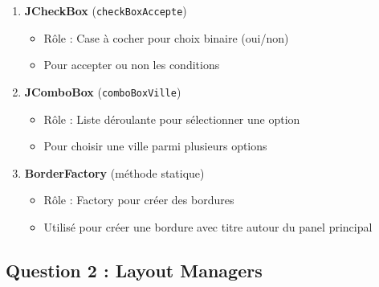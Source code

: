 \documentclass[11pt,a4paper]{article}
\begin{document}
\begin{correctionbox}
\begin{enumerate}
    \item \textbf{JCheckBox} (\texttt{checkBoxAccepte})
    \begin{itemize}
        \item Rôle : Case à cocher pour choix binaire (oui/non)
        \item Pour accepter ou non les conditions
    \end{itemize}
    
    \item \textbf{JComboBox} (\texttt{comboBoxVille})
    \begin{itemize}
        \item Rôle : Liste déroulante pour sélectionner une option
        \item Pour choisir une ville parmi plusieurs options
    \end{itemize}
    
    \item \textbf{BorderFactory} (méthode statique)
    \begin{itemize}
        \item Rôle : Factory pour créer des bordures
        \item Utilisé pour créer une bordure avec titre autour du panel principal
    \end{itemize}
\end{enumerate}
\end{correctionbox}

\subsection{Question 2 : Layout Managers}
\end{document}
